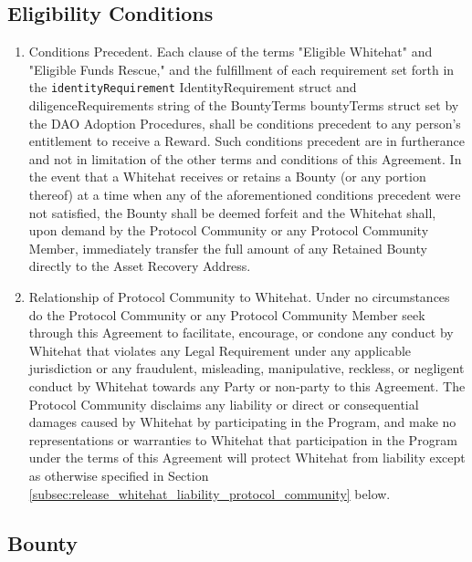 \documentclass{article}
\newcommand{\code}[1]{%
    \colorbox{red!10}{\textcolor{orange!80!black}{\texttt{#1}}}%
}
\begin{document}
\subsection{Eligibility Conditions}\label{subsec:eligibility_conditions}

\begin{enumerate}

    \item Conditions Precedent. Each clause of the terms "Eligible Whitehat" and "Eligible Funds Rescue," and the fulfillment of each requirement set forth in the \code{identityRequirement} IdentityRequirement struct and diligenceRequirements string of the BountyTerms bountyTerms struct set by the DAO Adoption Procedures, shall be conditions precedent to any person's entitlement to receive a Reward. Such conditions precedent are in furtherance and not in limitation of the other terms and conditions of this Agreement. In the event that a Whitehat receives or retains a Bounty (or any portion thereof) at a time when any of the aforementioned conditions precedent were not satisfied, the Bounty shall be deemed forfeit and the Whitehat shall, upon demand by the Protocol Community or any Protocol Community Member, immediately transfer the full amount of any Retained Bounty directly to the Asset Recovery Address.

    \item Relationship of Protocol Community to Whitehat. Under no circumstances do the Protocol Community or any Protocol Community Member seek through this Agreement to facilitate, encourage, or condone any conduct by Whitehat that violates any Legal Requirement under any applicable jurisdiction or any fraudulent, misleading, manipulative, reckless, or negligent conduct by Whitehat towards any Party or non-party to this Agreement. The Protocol Community disclaims any liability or direct or consequential damages caused by Whitehat by participating in the Program, and make no representations or warranties to Whitehat that participation in the Program under the terms of this Agreement will protect Whitehat from liability except as otherwise specified in Section \ref{subsec:release_whitehat_liability_protocol_community} below.

\end{enumerate}

\subsection{Bounty}\label{subsec:bounty}
\end{document}
